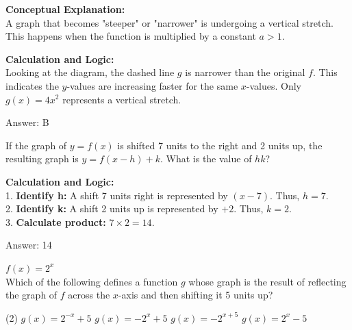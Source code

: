 \documentclass[11pt,paper=a4,answers]{exam}
\begin{document}
\begin{questions}
\begin{solution}
\textbf{Conceptual Explanation:} \\
A graph that becomes "steeper" or "narrower" is undergoing a vertical stretch. This happens when the function is multiplied by a constant $a > 1$.

\vspace{20pt}

\textbf{Calculation and Logic:} \\
Looking at the diagram, the dashed line $g$ is narrower than the original $f$. This indicates the $y$-values are increasing faster for the same $x$-values. Only $g(x) = 4x^2$ represents a vertical stretch.

\vspace{25pt}

Answer: \colorbox{yellow!100}{B}
\end{solution}

\vspace{40pt}

\question
If the graph of $y = f(x)$ is shifted 7 units to the right and 2 units up, the resulting graph is $y = f(x-h) + k$. What is the value of $hk$?

\begin{solution}
\textbf{Calculation and Logic:} \\
1. \textbf{Identify h:} A shift 7 units right is represented by $(x - 7)$. Thus, $h = 7$. \\
2. \textbf{Identify k:} A shift 2 units up is represented by $+ 2$. Thus, $k = 2$. \\
3. \textbf{Calculate product:} $7 \times 2 = 14$.

\vspace{25pt}

Answer: \colorbox{yellow!100}{14}
\end{solution}

\vspace{40pt}

\question
$f(x) = 2^x$ \\
Which of the following defines a function $g$ whose graph is the result of reflecting the graph of $f$ across the $x$-axis and then shifting it 5 units up?
\begin{tasks}(2)
    \task $g(x) = 2^{-x} + 5$
    \task $g(x) = -2^x + 5$
    \task $g(x) = -2^{x+5}$
    \task $g(x) = 2^x - 5$
\end{tasks}


\end{questions}
\end{document}
